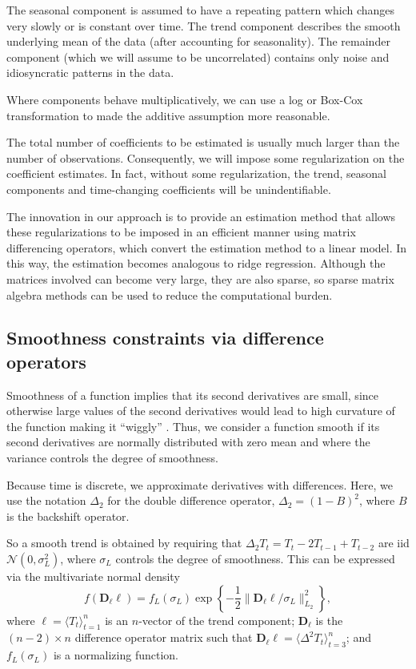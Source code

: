 \documentclass[11pt,a4paper,]{article}
\begin{document}
The seasonal component is assumed to have a repeating pattern which changes very slowly or is constant over time. The trend component describes the smooth underlying mean of the data (after accounting for seasonality). The remainder component (which we will assume to be uncorrelated) contains only noise and idiosyncratic patterns in the data.

Where components behave multiplicatively, we can use a log or Box-Cox transformation \autocite{BC64} to made the additive assumption more reasonable.

The total number of coefficients to be estimated is usually much larger than the number of observations. Consequently, we will impose some regularization on the coefficient estimates. In fact, without some regularization, the trend, seasonal components and time-changing coefficients will be unindentifiable.

The innovation in our approach is to provide an estimation method that allows these regularizations to be imposed in an efficient manner using matrix differencing operators, which convert the estimation method to a linear model. In this way, the estimation becomes analogous to ridge regression. Although the matrices involved can become very large, they are also sparse, so sparse matrix algebra methods can be used to reduce the computational burden.

\hypertarget{smoothness-constraints-via-difference-operators}{%
\subsection{Smoothness constraints via difference operators}\label{smoothness-constraints-via-difference-operators}}

Smoothness of a function implies that its second derivatives are small, since otherwise large values of the second derivatives would lead to high curvature of the function making it ``wiggly'' \autocite[see][]{Wood}. Thus, we consider a function smooth if its second derivatives are normally distributed with zero mean and where the variance controls the degree of smoothness.

Because time is discrete, we approximate derivatives with differences. Here, we use the notation \(\Delta_2\) for the double difference operator, \(\Delta_2 = (1-B)^2\), where \(B\) is the backshift operator.

So a smooth trend is obtained by requiring that \(\Delta_2 T_t = T_{t}-2T_{t-1}+T_{t-2}\) are iid \(\mathcal{N}(0,\sigma_L^2)\), where \(\sigma_L\) controls the degree of smoothness. This can be expressed via the multivariate normal density
\[
  f(\bm{D}_\ell \bm{\ell}) = f_L(\sigma_L) \exp\left\{-\frac{1}{2}\big\|\bm{D}_\ell \bm{\ell} / \sigma_L\big\|_{L_2}^2\right\},
\]
where
\(\bm{\ell} = \langle T_{t} \rangle_{t=1}^{n}\) is an \(n\)-vector of the trend component;
\(\bm{D}_\ell\) is the \((n-2) \times n\) difference operator matrix such that \(\bm{D}_\ell\bm{\ell} = \langle\Delta^2 T_{t}\rangle_{t=3}^n\);
and \(f_L(\sigma_L)\) is a normalizing function.
\end{document}
